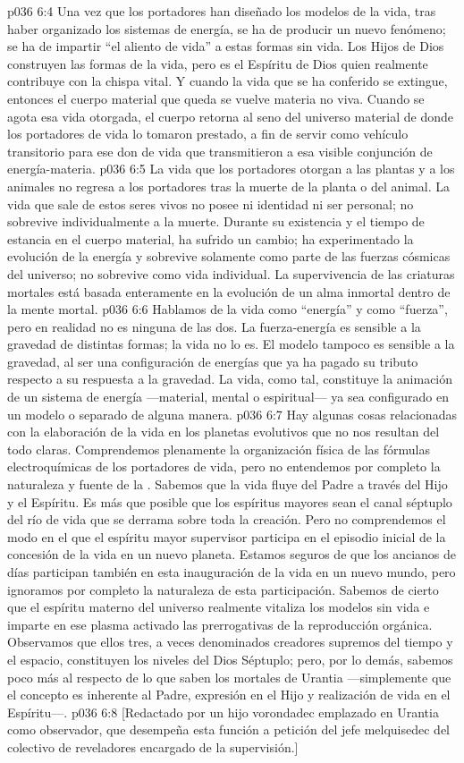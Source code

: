 \vs p036 6:4 \pc Una vez que los portadores han diseñado los modelos de la vida, tras haber organizado los sistemas de energía, se ha de producir un nuevo fenómeno; se ha de impartir “el aliento de vida” a estas formas sin vida. Los Hijos de Dios construyen las formas de la vida, pero es el Espíritu de Dios quien realmente contribuye con la chispa vital. Y cuando la vida que se ha conferido se extingue, entonces el cuerpo material que queda se vuelve materia no viva. Cuando se agota esa vida otorgada, el cuerpo retorna al seno del universo material de donde los portadores de vida lo tomaron prestado, a fin de servir como vehículo transitorio para ese don de vida que transmitieron a esa visible conjunción de energía\hyp{}materia.
\vs p036 6:5 La vida que los portadores otorgan a las plantas y a los animales no regresa a los portadores tras la muerte de la planta o del animal. La vida que sale de estos seres vivos no posee ni identidad ni ser personal; no sobrevive individualmente a la muerte. Durante su existencia y el tiempo de estancia en el cuerpo material, ha sufrido un cambio; ha experimentado la evolución de la energía y sobrevive solamente como parte de las fuerzas cósmicas del universo; no sobrevive como vida individual. La supervivencia de las criaturas mortales está basada enteramente en la evolución de un alma inmortal dentro de la mente mortal.
\vs p036 6:6 \pc Hablamos de la vida como “energía” y como “fuerza”, pero en realidad no es ninguna de las dos. La fuerza\hyp{}energía es sensible a la gravedad de distintas formas; la vida no lo es. El modelo tampoco es sensible a la gravedad, al ser una configuración de energías que ya ha pagado su tributo respecto a su respuesta a la gravedad. La vida, como tal, constituye la animación de un sistema de energía ---material, mental o espiritual--- ya sea configurado en un modelo o separado de alguna manera.
\vs p036 6:7 \pc Hay algunas cosas relacionadas con la elaboración de la vida en los planetas evolutivos que no nos resultan del todo claras. Comprendemos plenamente la organización física de las fórmulas electroquímicas de los portadores de vida, pero no entendemos por completo la naturaleza y fuente de la . Sabemos que la vida fluye del Padre a través del Hijo y  el Espíritu. Es más que posible que los espíritus mayores sean el canal séptuplo del río de vida que se derrama sobre toda la creación. Pero no comprendemos el modo en el que el espíritu mayor supervisor participa en el episodio inicial de la concesión de la vida en un nuevo planeta. Estamos seguros de que los ancianos de días participan también en esta inauguración de la vida en un nuevo mundo, pero ignoramos por completo la naturaleza de esta participación. Sabemos de cierto que el espíritu materno del universo realmente vitaliza los modelos sin vida e imparte en ese plasma activado las prerrogativas de la reproducción orgánica. Observamos que ellos tres, a veces denominados creadores supremos del tiempo y el espacio, constituyen los niveles del Dios Séptuplo; pero, por lo demás, sabemos poco más al respecto de lo que saben los mortales de Urantia ---simplemente que el concepto es inherente al Padre, expresión en el Hijo y realización de vida en el Espíritu---.
\vsetoff
\vs p036 6:8 [Redactado por un hijo vorondadec emplazado en Urantia como observador, que desempeña esta función a petición del jefe melquisedec del colectivo de reveladores encargado de la supervisión.]

